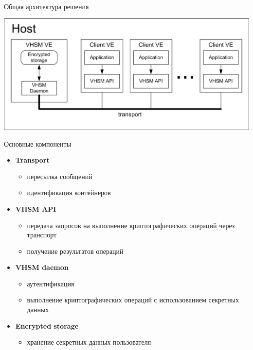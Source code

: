 \documentclass[utf8, 11pt]{beamer}
\begin{document}
\begin{frame}{Общая архитектура решения}
\begin{center}
\includegraphics[width=0.95\paperwidth]{img2}
\end{center}
\end{frame}

\begin{frame}{Основные компоненты}
\begin{itemize}
\item {\bf Transport}
	\begin{itemize}
		\item пересылка сообщений
		\item идентификация контейнеров
	\end{itemize}
\item {\bf VHSM API}
	\begin{itemize}
		\item передача запросов на выполнение криптографических операций через транспорт
		\item получение результатов операций
	\end{itemize}
\item {\bf VHSM daemon}
	\begin{itemize}
		\item аутентификация
		\item выполнение криптографических операций с использованием секретных данных
	\end{itemize}
\item {\bf Encrypted storage}
	\begin{itemize}
		\item хранение секретных данных пользователя
	\end{itemize}
\end{itemize}

\end{frame}
\end{document}
